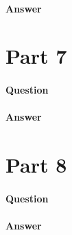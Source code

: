 \documentclass[11pt,twoside]{article}
\begin{document}
\paragraph{Answer}


\clearpage

\section*{Part 7}
\paragraph{Question}


\paragraph{Answer}


\clearpage

\section*{Part 8}
\paragraph{Question}


\paragraph{Answer}


\clearpage
\end{document}
